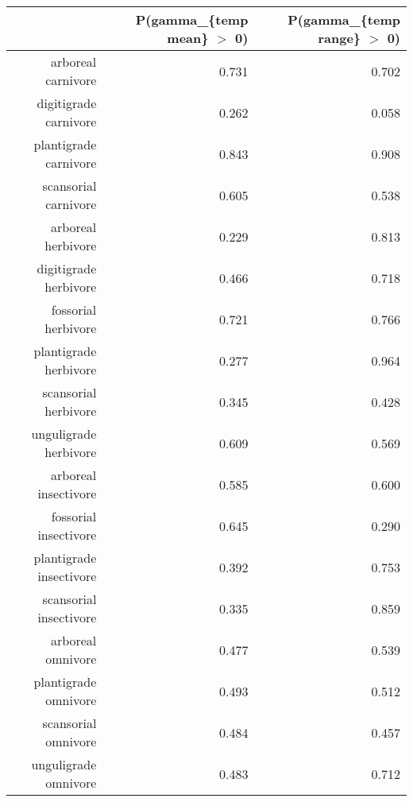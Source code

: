 \begin{table}[ht]
\centering
\begin{tabular}{rrr}
  \hline
 & P(gamma\_\{temp mean\} $>$ 0) & P(gamma\_\{temp range\} $>$ 0) \\ 
  \hline
arboreal carnivore & 0.731 & 0.702 \\ 
  digitigrade carnivore & 0.262 & 0.058 \\ 
  plantigrade carnivore & 0.843 & 0.908 \\ 
  scansorial carnivore & 0.605 & 0.538 \\ 
  arboreal herbivore & 0.229 & 0.813 \\ 
  digitigrade herbivore & 0.466 & 0.718 \\ 
  fossorial herbivore & 0.721 & 0.766 \\ 
  plantigrade herbivore & 0.277 & 0.964 \\ 
  scansorial herbivore & 0.345 & 0.428 \\ 
  unguligrade herbivore & 0.609 & 0.569 \\ 
  arboreal insectivore & 0.585 & 0.600 \\ 
  fossorial insectivore & 0.645 & 0.290 \\ 
  plantigrade insectivore & 0.392 & 0.753 \\ 
  scansorial insectivore & 0.335 & 0.859 \\ 
  arboreal omnivore & 0.477 & 0.539 \\ 
  plantigrade omnivore & 0.493 & 0.512 \\ 
  scansorial omnivore & 0.484 & 0.457 \\ 
  unguligrade omnivore & 0.483 & 0.712 \\ 
   \hline
\end{tabular}
\label{tab:surv_temp}
\end{table}
